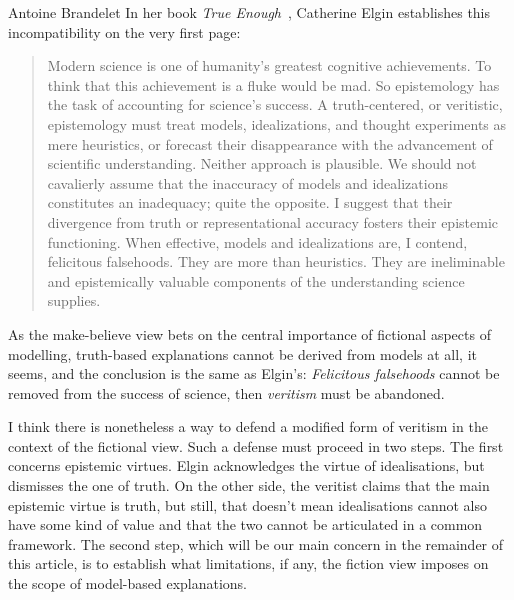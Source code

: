 \begin{artengenv}{Antoine Brandelet}
In her book \textit{True Enough}~\parencite*{Elgin2017}, Catherine Elgin establishes this incompatibility on the very first page: 

\begin{quote}
Modern science is one of humanity’s greatest cognitive achievements. To think that this achievement is a fluke would be mad. So epistemology has the task of accounting for science’s success. A truth-centered, or veritistic, epistemology must treat models, idealizations, and thought experiments as mere heuristics, or forecast their disappearance with the advancement of scientific understanding. Neither approach is plausible. We should not cavalierly assume that the inaccuracy of models and idealizations constitutes an inadequacy; quite the opposite. I suggest that their divergence from truth or representational accuracy fosters their epistemic functioning. When effective, models and idealizations are, I contend, felicitous falsehoods. They are more than heuristics. They are ineliminable and epistemically valuable components of the understanding science supplies.~\parencite[p.1]{Elgin2017}
\end{quote}

As the make-believe view bets on the central importance of fictional aspects of modelling, truth-based explanations cannot be derived from models at all, it seems, and the conclusion is the same as Elgin's: \textit{Felicitous falsehoods} cannot be removed from the success of science, then \textit{veritism} must be abandoned.

I think there is nonetheless a way to defend a modified form of veritism in the context of the fictional view. Such a defense must proceed in two steps. The first concerns epistemic virtues. Elgin acknowledges the virtue of idealisations, but dismisses the one of truth. On the other side, the veritist claims that the main epistemic virtue is truth, but still, that doesn't mean idealisations cannot also have some kind of value and that the two cannot be articulated in a common framework. The second step, which will be our main concern in the remainder of this article, is to establish what limitations, if any, the fiction view imposes on the scope of model-based explanations.


\end{artengenv}
